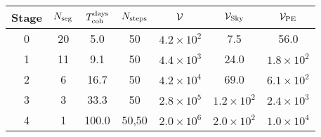 \begin{tabular}{c|cccccc}
Stage & $N_{\rm seg}$ & $T_{\rm coh}^{\rm days}$ &$N_{\rm steps}$ & $\mathcal{V}$ & $\mathcal{V}_{\rm Sky}$ & $\mathcal{V}_{\rm PE}$ \\ \hline
0 & 20 & 5.0 & 50 & $4.2{\times}10^{2}$ & 7.5 & 56.0 \\
1 & 11 & 9.1 & 50 & $4.4{\times}10^{3}$ & 24.0 & $1.8{\times}10^{2}$ \\
2 & 6 & 16.7 & 50 & $4.2{\times}10^{4}$ & 69.0 & $6.1{\times}10^{2}$ \\
3 & 3 & 33.3 & 50 & $2.8{\times}10^{5}$ & $1.2{\times}10^{2}$ & $2.4{\times}10^{3}$ \\
4 & 1 & 100.0 & 50,50 & $2.0{\times}10^{6}$ & $2.0{\times}10^{2}$ & $1.0{\times}10^{4}$ \\
\end{tabular}
